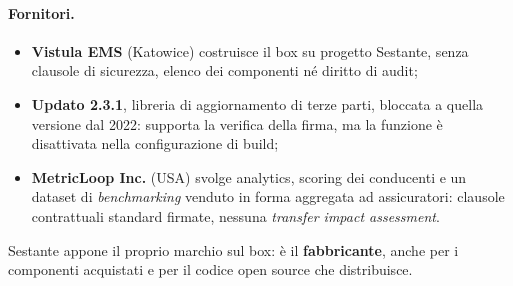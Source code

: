 \paragraph{Fornitori.}
\begin{itemize}
  \item \textbf{Vistula EMS} (Katowice) costruisce il box su progetto Sestante, senza clausole di
    sicurezza, elenco dei componenti né diritto di audit;
  \item \textbf{Updato 2.3.1}, libreria di aggiornamento di terze parti, bloccata a quella versione dal
    2022: supporta la verifica della firma, ma la funzione è disattivata nella configurazione di build;
  \item \textbf{MetricLoop Inc.} (USA) svolge analytics, scoring dei conducenti e un dataset di
    \emph{benchmarking} venduto in forma aggregata ad assicuratori: clausole contrattuali standard
    firmate, nessuna \emph{transfer impact assessment}.
\end{itemize}
Sestante appone il proprio marchio sul box: è il \textbf{fabbricante}, anche per i componenti
acquistati e per il codice open source che distribuisce.

